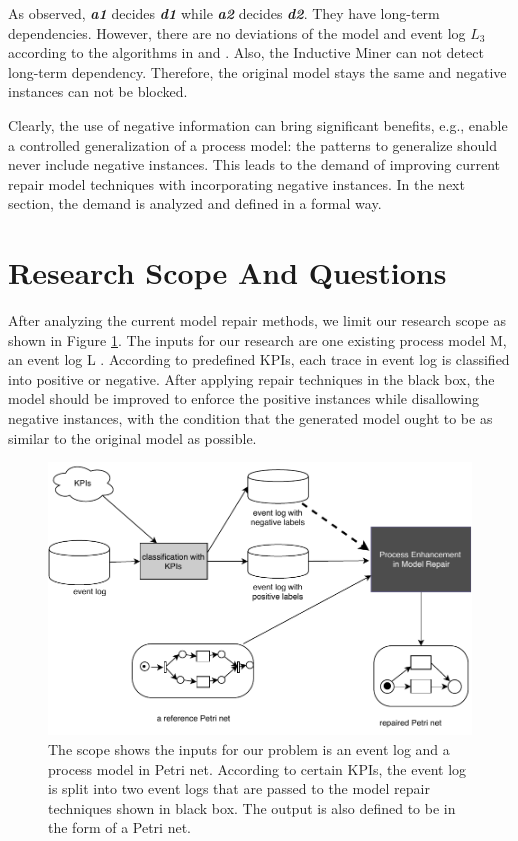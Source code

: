 As observed, \textbf{\emph{a1}} decides \textbf{\emph{d1}} while \textbf{\emph{a2}} decides \textbf{\emph{d2}}. They have long-term dependencies.
However, there are no deviations of the model and event log $L_3$ according to the  algorithms in  \cite{fahland2015model} and  \cite{dees2017enhancing}. Also, the Inductive Miner can not detect long-term dependency. Therefore, the original model stays the same and negative instances can not be blocked.

Clearly, the use of negative information can bring significant benefits, e.g., enable a controlled generalization of a process model: the patterns to generalize should never include negative instances. This leads to the demand of improving current repair model techniques with incorporating negative instances. In the next section, the demand is analyzed and defined in a formal way.

\section{Research Scope And Questions }
After analyzing the current model repair methods, we limit our research scope as shown in Figure \ref{fig:scope}.  The inputs for our research are one existing process model M, an event log L . According to predefined KPIs, each trace in event log is classified into positive or negative. After applying repair techniques in the black box, the model should be improved to enforce the positive instances while disallowing negative instances, with the condition that the generated model ought to be as similar to the original model as possible. 
\begin{figure}
	\centering
	\includegraphics[width=\textwidth]{figures/introduction/P06-problem-scope.pdf}
	\caption[The reseach problem scope]{The scope shows the inputs for our problem is an event log and a process model in Petri net. According to certain KPIs, the event log is split into two event logs that are passed to the model repair techniques shown in black box. The output is also defined to be in the form of a Petri net. }
	\label{fig:scope}
\end{figure}

